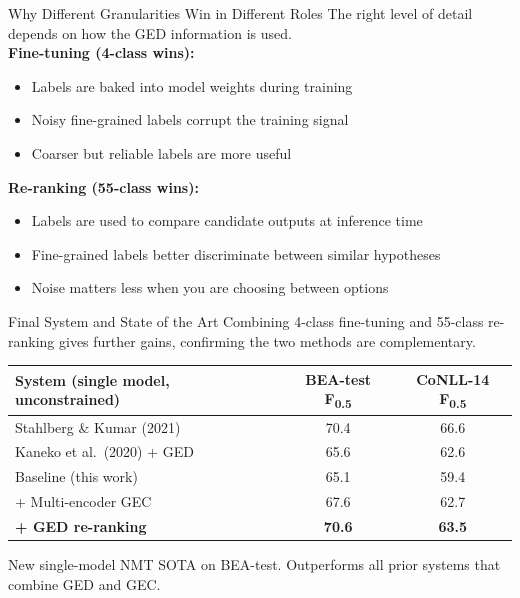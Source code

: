 \documentclass[aspectratio=169]{beamer}
\newcommand{\fhalf}{F\textsubscript{0.5}}
\begin{document}
\begin{frame}{Why Different Granularities Win in Different Roles}
  The right level of detail depends on how the GED information is used.\\[1.5em]

  \textbf{Fine-tuning (4-class wins):}
  \begin{itemize}
    \item Labels are baked into model weights during training
    \item Noisy fine-grained labels corrupt the training signal
    \item Coarser but reliable labels are more useful
  \end{itemize}

  \vspace{1em}
  \textbf{Re-ranking (55-class wins):}
  \begin{itemize}
    \item Labels are used to compare candidate outputs at inference time
    \item Fine-grained labels better discriminate between similar hypotheses
    \item Noise matters less when you are choosing between options
  \end{itemize}
\end{frame}


\begin{frame}{Final System and State of the Art}
  Combining 4-class fine-tuning and 55-class re-ranking gives further gains,
  confirming the two methods are complementary.\\[1em]

  \begin{center}
  \begin{tabular}{lcc}
    \toprule
    \textbf{System (single model, unconstrained)} & \textbf{BEA-test \fhalf} & \textbf{CoNLL-14 \fhalf} \\
    \midrule
    Stahlberg \& Kumar (2021) & 70.4 & 66.6 \\
    Kaneko et al.\ (2020) + GED & 65.6 & 62.6 \\
    \midrule
    Baseline (this work) & 65.1 & 59.4 \\
    + Multi-encoder GEC & 67.6 & 62.7 \\
    \textbf{+ GED re-ranking} & \textbf{70.6} & \textbf{63.5} \\
    \bottomrule
  \end{tabular}
  \end{center}

  \vspace{0.5em}
  New single-model NMT SOTA on BEA-test. Outperforms all prior systems
  that combine GED and GEC.
\end{frame}
\end{document}

